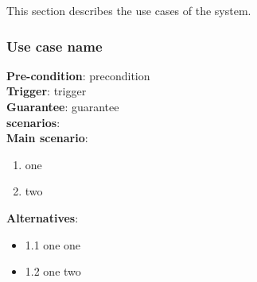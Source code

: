 This section describes the use cases of the system.

\subsubsection{Use case name}
\hangindent=0.5cm\textbf{Pre-condition}: precondition\\
\textbf{Trigger}: trigger\\
\textbf{Guarantee}: guarantee\\
\textbf{scenarios}:\\
\hangindent=1cm 	\textbf{Main scenario}:
					\begin{enumerate}
						\item one
						\item two
					\end{enumerate}
\hangindent=1cm 	\textbf{Alternatives}:
					\begin{itemize}
						\item 1.1 one one
						\item 1.2 one two
					\end{itemize}
